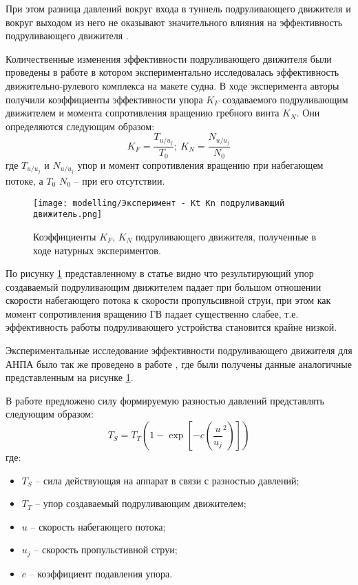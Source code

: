 При этом разница давлений вокруг входа в туннель подруливающего движителя и вокруг выходом из него не оказывают значительного влияния на эффективность подруливающего движителя \cite{brix1973lateral}.

Количественные изменения эффективности подруливающего движителя были проведены в работе \cite{chislett1966influence} в котором экспериментально исследовалась эффективность движительно-рулевого комплекса на макете судна.
В ходе эксперимента авторы получили коэффициенты эффективности упора $K_F$ создаваемого подруливающим движителем и момента сопротивления вращению гребного винта $K_N$.
Они определяются следующим образом:
\begin{equation*}
	K_F = \frac{T_{u/u_j}}{T_0}; \: K_N = \frac{N_{u/u_j}}{N_0}
\end{equation*}
\noindent где $T_{u/u_j}$ и $N_{u/u_j}$ упор и момент сопротивления вращению при набегающем потоке, а $T_0$ $N_0$ -- при его отсутствии.

\begin{figure}[ht]
    \centering
    \texttt{[image: modelling/Эксперимент - Kt Kn подруливающий движитель.png]}
    \caption{Коэффициенты $K_F$, $K_N$ подруливающего движителя, полученные в ходе натурных экспериментов.}
    \label{fig:tunnel_effectivness}
\end{figure}

По рисунку \ref{fig:tunnel_effectivness} представленному в статье \cite{chislett1966influence} видно что результирующий упор создаваемый подруливающим движителем падает при большом отношении скорости набегающего потока к скорости пропульсивной струи, при этом как момент сопротивления вращению ГВ падает существенно слабее, т.е. эффективность работы подруливающего устройства становится крайне низкой.

Экспериментальные исследование эффективности подруливающего движителя для АНПА было так же проведено в работе \cite{beveridge1972design}, где были получены данные аналогичные представленным на рисунке \ref{fig:tunnel_effectivness}.

В работе \cite{palmer2009analysis} предложено силу формируемую разностью давлений представлять следующим образом:
\begin{equation}
    \label{eq:thrust_tunnel}
	T_S = T_T (1 - \exp \left[ -c \left( \frac{u}{u_j}^2 \right) \right])
\end{equation}
\noindent где:
\begin{itemize}
	\item $T_S$ -- сила действующая на аппарат в связи с разностью давлений;
	\item $T_T$ -- упор создаваемый подруливающим движителем;
	\item $u$ -- скорость набегающего потока;
	\item $u_j$ -- скорость пропульстивной струи;
	\item $c$ -- коэффициент подавления упора.
\end{itemize}

